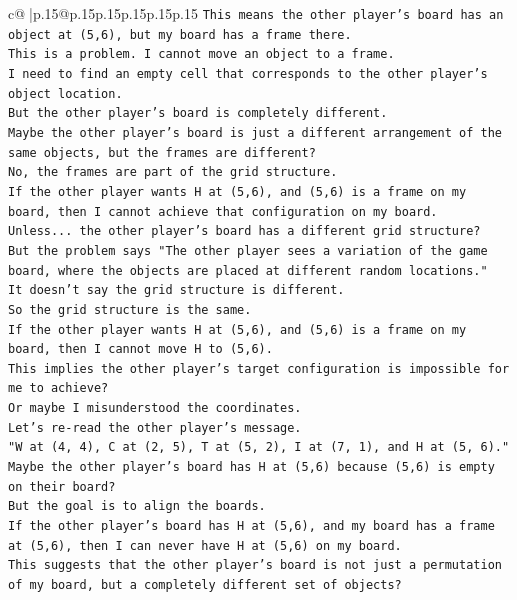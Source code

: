 \documentclass{article}
\begin{document}
{\begin{supertabular}{c@{$\;$}|p{.15\linewidth}@{}p{.15\linewidth}p{.15\linewidth}p{.15\linewidth}p{.15\linewidth}p{.15\linewidth}}
{{{\texttt{This means the other player's board has an object at (5,6), but my board has a frame there.} \\
\texttt{This is a problem. I cannot move an object to a frame.} \\
\texttt{I need to find an empty cell that corresponds to the other player's object location.} \\
\texttt{But the other player's board is completely different.} \\
\texttt{Maybe the other player's board is just a different arrangement of the same objects, but the frames are different?} \\
\texttt{No, the frames are part of the grid structure.} \\
\texttt{If the other player wants H at (5,6), and (5,6) is a frame on my board, then I cannot achieve that configuration on my board.} \\
\texttt{Unless... the other player's board has a different grid structure?} \\
\texttt{But the problem says "The other player sees a variation of the game board, where the objects are placed at different random locations."} \\
\texttt{It doesn't say the grid structure is different.} \\
\texttt{So the grid structure is the same.} \\
\texttt{If the other player wants H at (5,6), and (5,6) is a frame on my board, then I cannot move H to (5,6).} \\
\texttt{This implies the other player's target configuration is impossible for me to achieve?} \\
\texttt{Or maybe I misunderstood the coordinates.} \\
\texttt{Let's re{-}read the other player's message.} \\
\texttt{"W at (4, 4), C at (2, 5), T at (5, 2), I at (7, 1), and H at (5, 6)."} \\
\texttt{Maybe the other player's board has H at (5,6) because (5,6) is empty on their board?} \\
\texttt{But the goal is to align the boards.} \\
\texttt{If the other player's board has H at (5,6), and my board has a frame at (5,6), then I can never have H at (5,6) on my board.} \\
\texttt{This suggests that the other player's board is not just a permutation of my board, but a completely different set of objects?} \\
}}}
\end{supertabular}}
\end{document}
